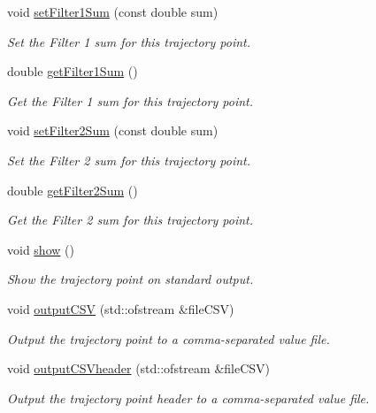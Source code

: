\begin{DoxyCompactItemize}
void \hyperlink{classTrajectoryPoint_aeb7e7d54d48f10cd7a92411cdbbd6f91}{set\-Filter1\-Sum} (const double sum)
\begin{DoxyCompactList}\small\item\em Set the Filter 1 sum for this trajectory point. \end{DoxyCompactList}\item 
double \hyperlink{classTrajectoryPoint_a978c0ae5481d1c91374e225076b9625b}{get\-Filter1\-Sum} ()
\begin{DoxyCompactList}\small\item\em Get the Filter 1 sum for this trajectory point. \end{DoxyCompactList}\item 
void \hyperlink{classTrajectoryPoint_a6284a1c19021694a03c82436a9bef822}{set\-Filter2\-Sum} (const double sum)
\begin{DoxyCompactList}\small\item\em Set the Filter 2 sum for this trajectory point. \end{DoxyCompactList}\item 
double \hyperlink{classTrajectoryPoint_a6d81a631ced4ff5d73434c6c0e0adeaf}{get\-Filter2\-Sum} ()
\begin{DoxyCompactList}\small\item\em Get the Filter 2 sum for this trajectory point. \end{DoxyCompactList}\item 
void \hyperlink{classTrajectoryPoint_ae74248e33ae5355bebd7ba894dfddc36}{show} ()
\begin{DoxyCompactList}\small\item\em Show the trajectory point on standard output. \end{DoxyCompactList}\item 
void \hyperlink{classTrajectoryPoint_a168f92496430009453c052e042803aa8}{output\-C\-S\-V} (std\-::ofstream \&file\-C\-S\-V)
\begin{DoxyCompactList}\small\item\em Output the trajectory point to a comma-\/separated value file. \end{DoxyCompactList}\item 
void \hyperlink{classTrajectoryPoint_a8063a1ca05dd41d3df6299b51147a998}{output\-C\-S\-Vheader} (std\-::ofstream \&file\-C\-S\-V)
\begin{DoxyCompactList}\small\item\em Output the trajectory point header to a comma-\/separated value file. \end{DoxyCompactList}\end{DoxyCompactItemize}

